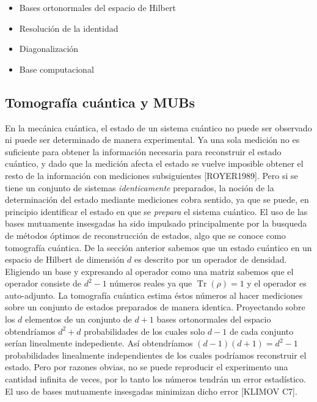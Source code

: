 \documentclass[a4paper]{report}
\DeclareMathOperator{\Tr}{Tr}
\begin{document}
  \begin{itemize}
    \item Bases ortonormales del espacio de Hilbert
    \item Resolución de la identidad
    \item Diagonalización
    \item Base computacional
  \end{itemize}

  \subsection{Tomografía cuántica y MUBs}

  En la mecánica cuántica, el estado de un sistema cuántico
  no puede ser observado ni puede ser determinado de manera
  experimental. Ya una sola medición no es suficiente para
  obtener la información necesaria para reconstruir el
  estado cuántico, y dado que la medición afecta el estado
  se vuelve imposible obtener el resto de la información con
  mediciones subsiguientes [ROYER1989]. Pero si se tiene un
  conjunto de sistemas \textit{identicamente} preparados, la
  noción de la determinación del estado mediante mediciones
  cobra sentido, ya que se puede, en principio identificar
  el estado en que se \textit{prepara} el sistema cuántico.
  El uso de las bases mutuamente insesgadas ha sido
  impulsado principalmente por la busqueda de métodos
  óptimos de reconstrucción de estados, algo que se conoce
  como tomografía cuántica. De la sección anterior sabemos
  que un estado cuántico en un espacio de Hilbert de
  dimensión $d$ es descrito por un operador de densidad.
  Eligiendo un base y expresando al operador como una matriz
  sabemos que el operador consiste de $d^2-1$ números reales
  ya que $\Tr(\rho) = 1$ y el operador es auto-adjunto. La
  tomografía cuántica estima éstos números al hacer
  mediciones sobre un conjunto de estados preparados de
  manera identica. Proyectando sobre los $d$ elementos de un
  conjunto de $d+1$ bases ortonormales del espacio
  obtendríamos $d^2+d$ probabilidades de los cuales solo
  $d-1$ de cada conjunto serían linealmente indepediente.
  Así obtendríamos $(d-1)(d+1) = d^2-1$ probabilidades
  linealmente independientes de los cuales podríamos
  reconstruir el estado. Pero por razones obvias, no se
  puede reproducir el experimento una cantidad infinita de
  veces, por lo tanto los números tendrán un error
  estadístico. El uso de bases mutuamente insesgadas
  minimizan dicho error [KLIMOV C7].
\end{document}
